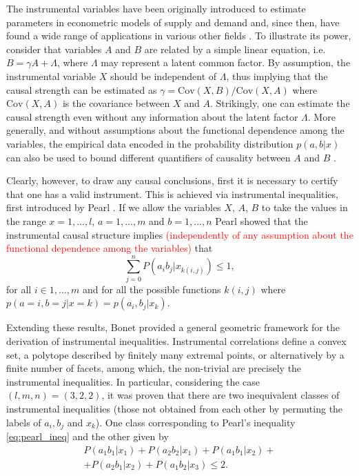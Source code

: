 \documentclass[letterpaper]{article}
\begin{document}
The instrumental variables have been originally introduced to estimate parameters
in econometric models of supply and demand \cite{economic} and, since then, have found a
wide range of applications in various other fields \cite{economic2, economic3}. To illustrate its
power, consider that variables $A$ and $B$ are related by a simple linear
equation, i.e. $B=\gamma A +\Lambda$, where $\Lambda$ may represent a latent common
factor. By assumption, the instrumental variable $X$ should be independent of
$\Lambda$, thus implying that the causal strength can be estimated as $\gamma=
\mathrm{Cov}(X,B)/\mathrm{Cov}(X,A)$ where $\mathrm{Cov}(X,A)$ is the covariance between $X$ and $A$. Strikingly, one can
estimate the causal strength even without any information about the latent
factor $\Lambda$. More generally, and without assumptions about the functional
dependence among the variables, the empirical data encoded in the probability
distribution $p(a,b \vert x)$ can also be used to bound different quantifiers of
causality between $A$ and $B$ \cite{pearlbook,Janzing2013}.


Clearly, however, to draw any causal conclusions, first it is necessary to
certify that one has a valid instrument. This is achieved via instrumental
inequalities, first introduced by Pearl \cite{pearl1995}. If we allow the variables $X$,
$A$, $B$ to take the values in the range  $x=1,\dots,l$, $a=1,\dots,m$ and
$b=1,\dots,n$ Pearl showed that the instrumental causal structure implies \textcolor{red}{(independently of any assumption about the functional dependence among the variables)} that 
\begin{equation} 
    \sum_{j=0}^{n} P(a_i b_j|x_{k(i,j)}) \le 1,
    \label{eq:pearl_ineq}
\end{equation}
for all $i \in {1,\ldots, m}$ and for all the possible functions $k(i,j)$ where $p(a=i,b=j\vert x=k)=p(a_i,b_j|x_k)$.

Extending these results, Bonet \cite{bonet2001} provided a 
general geometric framework for the derivation of instrumental inequalities.
Instrumental correlations define a convex set, a polytope described by finitely
many extremal points, or alternatively by a finite number of facets, among which, the
non-trivial are precisely the instrumental inequalities. In particular,
considering the case $(l,m,n) = (3,2,2)$, it was proven that there are two
inequivalent classes of instrumental inequalities (those not obtained from each
other by permuting the labels of $a_i,b_j$ and $x_k$). One class corresponding
to Pearl's inequality \eqref{eq:pearl_ineq} and the other given by
\begin{multline}
    P(a_1 b_1 | x_1) + P(a_2 b_2 | x_1) + 
    P(a_1 b_1 | x_2) +\\+ P(a_2 b_1 | x_2) + 
    P(a_1 b_2 | x_3) \le 2.
    \label{eq:bonet_ineq}
\end{multline}
\end{document}
